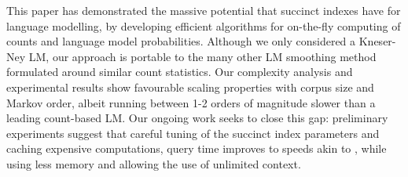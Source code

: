 This paper has demonstrated the massive potential that succinct indexes have for language modelling, by developing efficient algorithms for on-the-fly computing of \ngram counts and language model probabilities.
Although we only considered a Kneser-Ney LM, our approach is portable to the many other LM smoothing method formulated around similar count statistics.
Our complexity analysis and experimental results show favourable scaling properties with corpus size and Markov order, albeit running between 1-2 orders of magnitude slower than a leading count-based LM.
Our ongoing work seeks to close this gap: preliminary experiments suggest that careful tuning of the succinct index parameters and caching expensive computations, query time improves to speeds akin to \SRILM, while using less memory and allowing the use of unlimited context.

